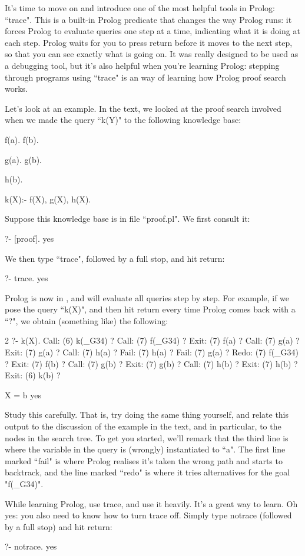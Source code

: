 It's time to move on and introduce one of the most helpful tools in
Prolog: ``trace". This is a built-in
Prolog predicate that changes the
way Prolog runs: it forces Prolog to evaluate queries one step at a
time, indicating what it is doing at each step. Prolog waits for you
to press return before it moves to the next step, so that you can see
exactly what is going on. It was really designed to be used as a
debugging tool, but it's also helpful when you're learning
Prolog: stepping through programs using ``trace" is an
 way of learning how Prolog proof search works.

Let's look at an example.  In the text, we looked at the proof
search involved when we made the query ``k(Y)" to the following
knowledge base:
\begin{LPNcodedisplay}
f(a).
f(b).

g(a).
g(b).

h(b).

k(X):- f(X), g(X), h(X).
\end{LPNcodedisplay}

Suppose this knowledge base is in file ``proof.pl". We first consult
it:
\begin{LPNcodedisplay}
?- [proof].
yes
\end{LPNcodedisplay}
%
We then type ``trace", followed by a full stop,  and hit return:
\begin{LPNcodedisplay}
?- trace.
yes
\end{LPNcodedisplay}
%
Prolog is now in , and will evaluate all queries step by
step.  For example, if we pose the query ``k(X)", and then hit return
every time Prolog comes back with a ``?", we obtain (something like)
the following:
\begin{LPNcodedisplay}
[trace] 2 ?- k(X).
   Call: (6) k(_G34) ?
   Call: (7) f(_G34) ?
   Exit: (7) f(a) ?
   Call: (7) g(a) ?
   Exit: (7) g(a) ?
   Call: (7) h(a) ?
   Fail: (7) h(a) ?
   Fail: (7) g(a) ?
   Redo: (7) f(_G34) ?
   Exit: (7) f(b) ?
   Call: (7) g(b) ?
   Exit: (7) g(b) ?
   Call: (7) h(b) ?
   Exit: (7) h(b) ?
   Exit: (6) k(b) ?

X = b
yes
\end{LPNcodedisplay}

Study this carefully. That is, try doing the same thing yourself, and
relate this output to the discussion of the example in the text, and
in particular, to the nodes in the search tree.  To get you started,
we'll remark that the third line is where the variable in the query is
(wrongly) instantiated to ``a". The first line marked ``fail" is where
Prolog realises it's taken the wrong path and starts to backtrack, and
the line marked ``redo" is where it tries alternatives for the goal
"f(\_G34)".

\clearpage
While learning Prolog, use trace, and use it heavily. It's a great way
to learn.
Oh yes: you also need to know how to turn trace off. Simply type
notrace (followed by a full
stop) and hit return:
\begin{LPNcodedisplay}
?- notrace.
yes
\end{LPNcodedisplay}
